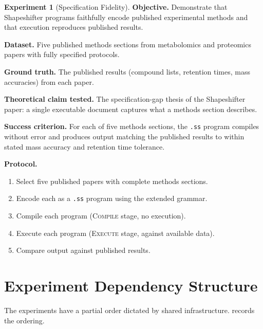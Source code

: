 \documentclass[11pt,a4paper]{article}
\theoremstyle{planstyle}
\theoremstyle{definition}
\newtheorem{experiment}[theorem]{Experiment}
\theoremstyle{remark}
\newcommand{\shk}[1]{\texttt{#1}}
\begin{document}
\begin{experiment}[Specification Fidelity]
\label{exp:dsl}
\textbf{Objective.} Demonstrate that Shapeshifter programs faithfully
encode published experimental methods and that execution reproduces
published results.

\textbf{Dataset.} Five published methods sections from metabolomics and
proteomics papers with fully specified protocols.

\textbf{Ground truth.} The published results (compound lists, retention
times, mass accuracies) from each paper.

\textbf{Theoretical claim tested.} The specification-gap thesis of the
Shapeshifter paper: a single executable document captures what a methods
section describes.

\textbf{Success criterion.} For each of five methods sections, the
\shk{.ss} program compiles without error and produces output matching
the published results to within stated mass accuracy and retention time
tolerance.

\textbf{Protocol.}
\begin{enumerate}[nosep]
\item Select five published papers with complete methods sections.
\item Encode each as a \shk{.ss} program using the extended grammar.
\item Compile each program (\textsc{Compile} stage, no execution).
\item Execute each program (\textsc{Execute} stage, against available data).
\item Compare output against published results.
\end{enumerate}
\end{experiment}

\section{Experiment Dependency Structure}
\label{sec:dependencies}

The experiments have a partial order dictated by shared infrastructure.
 records the ordering.
\end{document}
